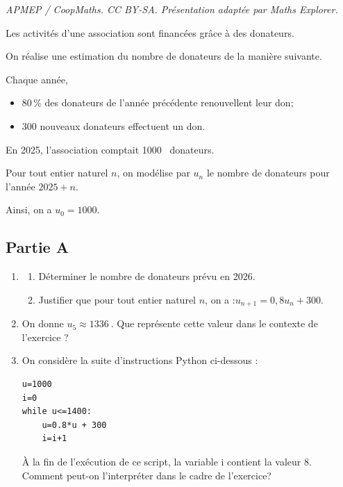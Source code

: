 \documentclass[10pt]{article}
\providecommand{\np}[2][]{{#2~#1}}
\begin{document}
\noindent\textit{APMEP / CoopMaths. CC BY-SA. Présentation adaptée par Maths Explorer.}\par\medskip
Les activités d'une association sont financées grâce à des donateurs.

On réalise une estimation du nombre de donateurs de la manière suivante.

Chaque année,
\begin{itemize}[left=5mm]
	\item 80\,\% des donateurs de l'année précédente renouvellent leur don;
	\item 300 nouveaux donateurs effectuent un don.
\end{itemize}

En 2025, l'association comptait \np{1000} donateurs.

Pour tout entier naturel $n$, on modélise par $u_{n}$ le nombre de donateurs pour l'année $2025+n$.

Ainsi, on a $u_{0}=1000$.

\subsection*{Partie A}

\begin{enumerate}
	\item \begin{enumerate}
		\item Déterminer le nombre de donateurs prévu en 2026.

		\item Justifier que pour tout entier naturel $n$, on a :\quad $u_{n+1}=0,8 u_{n}+300$.
	\end{enumerate}

	\item On donne $u_{5} \approx \np{1336}$. Que représente cette valeur dans le contexte de l'exercice ?

	\item On considère la suite d'instructions Python ci-dessous :

\begin{lstlisting}[style=python,xleftmargin=5cm,xrightmargin=5cm,numbers=none]
u=1000
i=0
while u<=1400:
	u=0.8*u + 300
	i=i+1
\end{lstlisting}

	À la fin de l'exécution de ce script, la variable i contient la valeur 8.\\
	Comment peut-on l'interpréter dans le cadre de l'exercice?
\end{enumerate}
\end{document}
